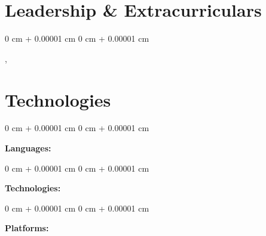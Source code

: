 \documentclass[10pt, letterpaper]{article}
\newenvironment{onecolentry}{
    \begin{adjustwidth}{
        0 cm + 0.00001 cm
    }{
        0 cm + 0.00001 cm
    }
}{
    \end{adjustwidth}
} %
\newenvironment{twocolentry}[2][]{
    \onecolentry
    \def\secondColumn{#2}
    \setcolumnwidth{\fill, 4.5 cm}
    \begin{paracol}{2}
}{
    \switchcolumn \raggedleft \secondColumn
    \end{paracol}
    \endonecolentry
} %
\begin{document}
\vspace{0.2cm}
\section{Leadership \& Extracurriculars}
\begin{twocolentry}{}
    {\bfseries {} }, \emph{}
\end{twocolentry}

\vspace{0.2cm}
\section{Technologies}
\begin{onecolentry}
\textbf{Languages:} 
\end{onecolentry}
\vspace{0.2 cm}
\begin{onecolentry}
\textbf{Technologies:} 
\end{onecolentry}
\vspace{0.2 cm}
\begin{onecolentry}
\textbf{Platforms:} 
\end{onecolentry}
\end{document}
